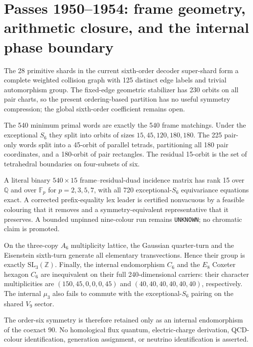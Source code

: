 \section*{Passes 1950--1954: frame geometry, arithmetic closure, and the internal phase boundary}
The 28 primitive shards in the current sixth-order decoder super-shard form a
complete weighted collision graph with 125 distinct edge labels and trivial
automorphism group.  The fixed-edge geometric stabilizer has 230 orbits on all
pair charts, so the present ordering-based partition has no useful symmetry
compression; the global sixth-order coefficient remains open.

The 540 minimum primal words are exactly the 540 frame matchings.  Under the
exceptional $S_6$ they split into orbits of sizes $15,45,120,180,180$.
The 225 pair-only words split into a 45-orbit of parallel tetrads, partitioning
all 180 pair coordinates, and a 180-orbit of pair rectangles.  The residual
15-orbit is the set of tetrahedral boundaries on four-subsets of six.

A literal binary $540\times15$ frame--residual-duad incidence matrix has rank
15 over $\mathbb Q$ and over $\mathbb F_p$ for $p=2,3,5,7$, with all 720
exceptional-$S_6$ equivariance equations exact.  A corrected prefix-equality lex
leader is certified nonvacuous by a feasible colouring that it removes and a
symmetry-equivalent representative that it preserves.  A bounded unpinned
nine-colour run remains \texttt{UNKNOWN}; no chromatic claim is promoted.

On the three-copy $A_6$ multiplicity lattice, the Gaussian quarter-turn and the
Eisenstein sixth-turn generate all elementary transvections.  Hence their group
is exactly $\mathrm{SL}_3(\mathbb Z)$.  Finally, the internal endomorphism
$C_6$ and the $E_8$ Coxeter hexagon $C_6$ are inequivalent on their full
240-dimensional carriers: their character multiplicities are
$(150,45,0,0,0,45)$ and $(40,40,40,40,40,40)$, respectively.  The internal
$\mu_3$ also fails to commute with the exceptional-$S_6$ pairing on the shared
$V_9$ sector.

The order-six symmetry is therefore retained only as an internal endomorphism
of the coexact 90.  No homological flux quantum, electric-charge derivation,
QCD-colour identification, generation assignment, or neutrino identification
is asserted.
